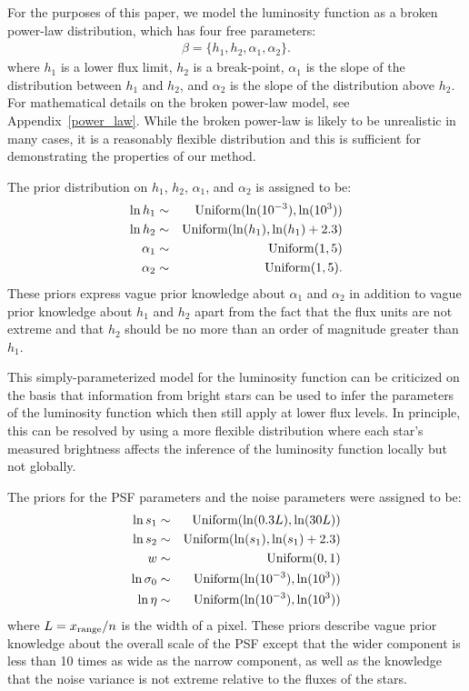 \documentclass[12pt, preprint]{aastex}
\begin{document}
For the purposes of this paper, we model the luminosity function as a broken
power-law distribution, which has four
free parameters:
\begin{eqnarray}
\beta = \{h_1, h_2, \alpha_1, \alpha_2\}.
\end{eqnarray}
where $h_1$ is a lower flux limit, $h_2$ is a break-point, $\alpha_1$ is
the slope of the distribution between $h_1$ and $h_2$, and $\alpha_2$ is the
slope of the distribution above $h_2$. For mathematical details on the broken power-law
model, see Appendix~\ref{power_law}. While the broken power-law is likely to be
unrealistic in many cases, it is a reasonably flexible distribution and this is
sufficient for demonstrating the properties of our method.

The prior distribution on $h_1$, $h_2$,
$\alpha_1$, and $\alpha_2$ is assigned to be:
\begin{eqnarray}
\ln h_1 &\sim& \textnormal{Uniform}(\ln(10^{-3}), \ln(10^3)) \\
\ln h_2 &\sim& \textnormal{Uniform}(\ln(h_1), \ln(h_1) + 2.3) \\
\alpha_1 &\sim& \textnormal{Uniform}(1, 5) \\
\alpha_2 &\sim& \textnormal{Uniform}(1, 5).
\end{eqnarray}
These priors express vague prior knowledge about $\alpha_1$ and $\alpha_2$ in
addition to vague prior knowledge about $h_1$ and $h_2$ apart from the fact
that the flux units are not extreme and that $h_2$ should be no more than an
order of magnitude greater than $h_1$.

This simply-parameterized model for the luminosity function can be criticized
on the basis that information from bright stars can be used to infer the
parameters of the luminosity function which then still apply at lower flux
levels. In principle, this can be resolved by using a more flexible distribution
\citep[e.g.][]{2008ApJ...682..874K} where each star's measured brightness
affects the inference of the luminosity function locally but not globally.

The priors for the PSF parameters and the noise parameters were assigned to be:
\begin{eqnarray}
\ln s_1 &\sim& \textnormal{Uniform}(\ln(0.3L), \ln(30L)) \\
\ln s_2 &\sim& \textnormal{Uniform}(\ln(s_1), \ln(s_1) + 2.3) \\
w &\sim& \textnormal{Uniform}(0, 1)\\
\ln \sigma_0 &\sim& \textnormal{Uniform}(\ln(10^{-3}), \ln(10^{3})) \\
\ln \eta &\sim& \textnormal{Uniform}(\ln(10^{-3}), \ln(10^{3}))
\end{eqnarray}
where $L = x_{\rm range}/n$ is the width of a pixel. These priors
describe vague prior knowledge about the overall scale of the PSF except that the
wider component is less than 10 times as wide as the narrow component, as well
as the knowledge that the noise variance is not extreme relative to the fluxes
of the stars.
\end{document}
